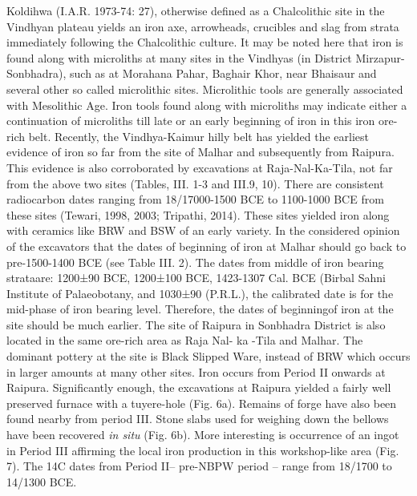 Koldihwa (I.A.R. 1973-74: 27), otherwise defined as a Chalcolithic site in the Vindhyan plateau yields an iron axe, arrowheads, crucibles and slag from strata immediately following the Chalcolithic culture. It may be noted here that iron is found along with microliths at many sites in the Vindhyas (in District Mirzapur-Sonbhadra), such as at Morahana Pahar, Baghair Khor, near Bhaisaur and several other so called microlithic sites. Microlithic tools are generally associated with Mesolithic Age. Iron tools found along with microliths may indicate either a continuation of microliths till late or an early beginning of iron in this iron ore-rich belt. Recently, the Vindhya-Kaimur hilly belt has yielded the earliest evidence of iron so far from the site of Malhar and subsequently from Raipura. This evidence is also corroborated by excavations at Raja-Nal-Ka-Tila, not far from the above two sites (Tables, III. 1-3 and III.9, 10). There are consistent radiocarbon dates ranging from 18/17000-1500 BCE to 1100-1000 BCE from these sites (Tewari, 1998, 2003; Tripathi, 2014). These sites yielded iron along with ceramics like BRW and BSW of an early variety. In the considered opinion of the excavators that the dates of beginning of iron at Malhar should go back to pre-1500-1400 BCE (see Table III. 2). The dates from middle of iron bearing strataare: 1200±90 BCE, 1200±100 BCE, 1423-1307 Cal. BCE (Birbal Sahni Institute of Palaeobotany, and 1030±90 (P.R.L.), the calibrated date is for the mid-phase of iron bearing level. Therefore, the dates of beginningof iron at the site should be much earlier. The site of Raipura in Sonbhadra District is also located in the same ore-rich area as Raja Nal- ka -Tila and Malhar. The dominant pottery at the site is Black Slipped Ware, instead of BRW which occurs in larger amounts at many other sites. Iron occurs from Period II onwards at Raipura. Significantly enough, the excavations at Raipura yielded a fairly well preserved furnace with a tuyere-hole (Fig. 6a). Remains of forge have also been found nearby from period III. Stone slabs used for weighing down the bellows have been recovered \textit{in situ }(Fig. 6b). More interesting is occurrence of an ingot in Period III affirming the local iron production in this workshop-like area (Fig. 7). The 14C dates from Period II– pre-NBPW period – range from 18/1700 to 14/1300 BCE.

